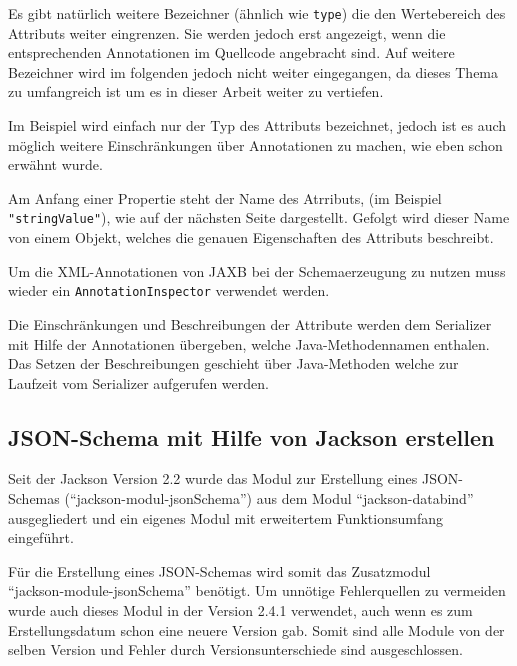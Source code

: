 Es gibt nat\"urlich weitere Bezeichner (\"ahnlich wie \texttt{type}) die den Wertebereich des Attributs weiter eingrenzen. Sie werden jedoch erst angezeigt, wenn die entsprechenden Annotationen im Quellcode angebracht sind. Auf weitere Bezeichner wird im folgenden jedoch nicht weiter eingegangen, da dieses Thema zu umfangreich ist um es in dieser Arbeit weiter zu vertiefen.


Im Beispiel wird einfach nur der Typ des Attributs bezeichnet, jedoch ist es auch m\"oglich weitere Einschr\"ankungen \"uber Annotationen zu machen, wie eben schon erw\"ahnt wurde.

Am Anfang einer Propertie steht der Name des Atrributs, (im Beispiel \\\texttt{"}\texttt{stringValue"}), wie auf der n\"achsten Seite dargestellt.
Gefolgt wird dieser Name von einem Objekt, welches die genauen Eigenschaften des Attributs beschreibt.

Um die XML-Annotationen von JAXB bei der Schemaerzeugung zu nutzen muss wieder ein \texttt{AnnotationInspector} verwendet werden.

Die Einschr\"ankungen und Beschreibungen der Attribute werden dem Serializer mit Hilfe der Annotationen \"ubergeben, welche Java-Methodennamen enthalen. 
Das Setzen der Beschreibungen geschieht \"uber Java-Methoden welche zur Laufzeit vom Serializer aufgerufen werden.




\subsection{JSON-Schema mit Hilfe von Jackson erstellen}
Seit der Jackson Version 2.2 wurde das Modul zur Erstellung eines JSON-Schemas ("`jackson-modul-jsonSchema"') aus dem Modul "`jackson-databind"' ausgegliedert und ein eigenes Modul mit erweitertem Funktionsumfang eingef\"uhrt. 

F\"ur die Erstellung eines JSON-Schemas wird somit das Zusatzmodul \\"`jackson-module-jsonSchema"' ben\"otigt. Um unn\"otige Fehlerquellen zu vermeiden wurde auch dieses Modul in der Version 2.4.1 verwendet, auch wenn es zum Erstellungsdatum schon eine neuere Version gab. Somit sind alle Module von der selben Version und Fehler durch Versionsunterschiede sind ausgeschlossen.

